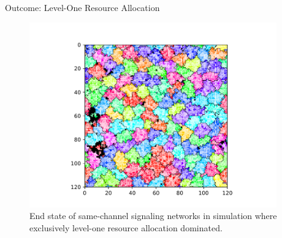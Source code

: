 \begin{frame}{Outcome: Level-One Resource Allocation}
\begin{figure}
\begin{columns}
\begin{column}{0.6\textwidth}
\includegraphics[width=\textwidth,trim={2.5cm 0 2.5cm 0},clip]{img/results/ChannelMap_1003_update24995104}
\end{column}
\begin{column}{0.4\textwidth}
\caption{
End state of same-channel signaling networks in simulation where exclusively level-one resource allocation dominated.
}
\end{column}
\end{columns}
\end{figure}
\end{frame}

